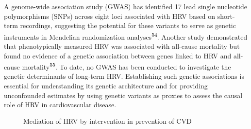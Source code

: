 \documentclass[
  a4paper,
  headsepline=true,
  open=any]{scrbook}
\begin{document}
A genome-wide association study (GWAS) has identified 17 lead single
nucleotide polymorphisms (SNPs) across eight loci associated with HRV
based on short-term recordings, suggesting the potential for these
variants to serve as genetic instruments in Mendelian randomization
analyses\textsuperscript{54}. Another study demonstrated that
phenotypically measured HRV was associated with all-cause mortality but
found no evidence of a genetic association between genes linked to HRV
and all-cause mortality\textsuperscript{55}. To date, no GWAS has been
conducted to investigate the genetic determinants of long-term HRV.
Establishing such genetic associations is essential for understanding
its genetic architecture and for providing unconfounded estimates by
using genetic variants as proxies to assess the causal role of HRV in
cardiovascular disease.

\begin{figure}

\begin{minipage}[t]{\linewidth}

{\centering 


\caption{Mediation of HRV by intervention in prevention of CVD}

}

\end{minipage}%

\end{figure}
\end{document}
